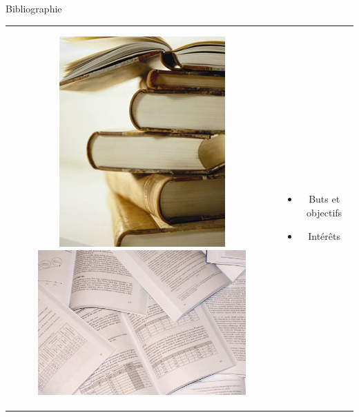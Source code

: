 \documentclass{beamer}
\begin{document}
\begin{frame}{Bibliographie}

\begin{tabular}{c c}
\begin{minipage}{0.4\linewidth}
\begin{figure}
\includegraphics[width=0.6\linewidth]{images/bibliographie.jpg}
\vspace{3mm}
\includegraphics[width=0.9\linewidth]{images/publications.jpg}
\end{figure}
\end{minipage}
&
\begin{minipage}{0.6\linewidth}
  \begin{itemize}
  \item Buts et objectifs
  \item Intérêts %

\end{itemize}
\end{minipage}
\end{tabular}
\end{frame}
\end{document}
